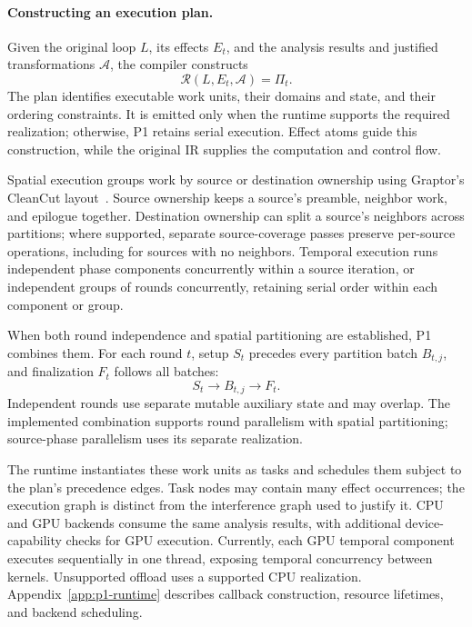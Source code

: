 \paragraph{Constructing an execution plan.}
Given the original loop $L$, its effects $E_t$, and the analysis results
and justified transformations $\mathcal A$, the compiler constructs
\[
\mathcal R(L,E_t,\mathcal A)=\Pi_t.
\]
The plan identifies executable work units, their domains and state, and
their ordering constraints. It is emitted only when the runtime supports
the required realization; otherwise, P1 retains serial execution. Effect
atoms guide this construction, while the original IR supplies the
computation and control flow.

Spatial execution groups work by source or destination ownership using
Graptor's CleanCut layout~\cite{10.1145/3392717.3392753}. Source ownership
keeps a source's preamble, neighbor work, and epilogue together.
Destination ownership can split a source's neighbors across partitions;
where supported, separate source-coverage passes preserve per-source
operations, including for sources with no neighbors. Temporal execution
runs independent phase components concurrently within a source iteration,
or independent groups of rounds concurrently, retaining serial order
within each component or group.

When both round independence and spatial partitioning are established,
P1 combines them. For each round $t$, setup $S_t$ precedes every partition
batch $B_{t,j}$, and finalization $F_t$ follows all batches:
\[
S_t\longrightarrow B_{t,j}\longrightarrow F_t.
\]
Independent rounds use separate mutable auxiliary state and may overlap.
The implemented combination supports round parallelism with spatial
partitioning; source-phase parallelism uses its separate realization.

The runtime instantiates these work units as tasks and schedules them
subject to the plan's precedence edges. Task nodes may contain many
effect occurrences; the execution graph is distinct from the interference
graph used to justify it. CPU and GPU backends consume the same analysis
results, with additional device-capability checks for GPU execution.
Currently, each GPU temporal component executes sequentially in one
thread, exposing temporal concurrency between kernels. Unsupported
offload uses a supported CPU realization. Appendix~\ref{app:p1-runtime}
describes callback construction, resource lifetimes, and backend scheduling.
